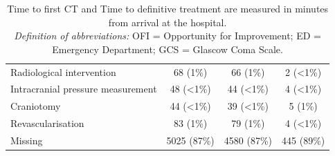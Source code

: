 \documentclass[12pt, a4paper]{article}
\begin{document}
\begin{appendices}
\begin{table}[t!]
{\begin{tabular}{lccc}
                \hspace{3mm}Radiological intervention         & 68 (1\%)          & 66 (1\%)          & 2 (\textless1\%) \\
                \hspace{3mm}Intracranial pressure measurement & 48 (\textless1\%) & 44 (\textless1\%) & 4 (\textless1\%) \\
                \hspace{3mm}Craniotomy                        & 44 (\textless1\%) & 39 (\textless1\%) & 5 (1\%)          \\
                \hspace{3mm}Revascularisation                 & 83 (1\%)          & 79 (1\%)          & 4 (\textless1\%) \\
                \hspace{3mm}Missing                           & 5025 (87\%)       & 4580 (87\%)       & 445 (89\%)       \\
                \bottomrule
            \end{tabular}
        }
        \caption*{\small Time to first CT and Time to definitive treatment are measured in minutes from arrival at the hospital.\\
            \textit{Definition of abbreviations:} OFI = Opportunity for Improvement; ED = Emergency Department; GCS = Glascow Coma Scale.}
    \end{table}


\end{appendices}
\end{document}
